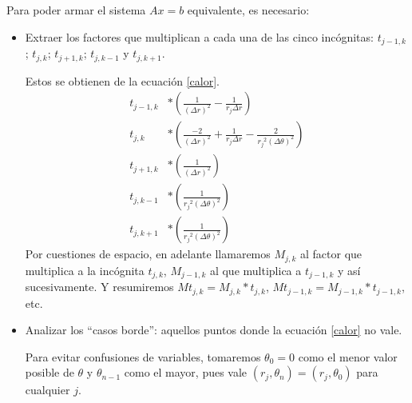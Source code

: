 Para poder armar el sistema $Ax=b$ equivalente, es necesario:
\begin{itemize}
 \item
    Extraer los factores que multiplican a cada una de las cinco incógnitas: $t_{j-1,k}$; $t_{j,k}$; $t_{j+1,k}$; $t_{j,k-1}$ y $t_{j,k+1}$.

    Estos se obtienen de la ecuación \ref{calor}.
    \begin{align*}
        t_{j-1, k}&*(\frac{1}{(\Delta r)^2} - \frac{1}{r_j \Delta r}) \\
        t_{j, k}  &*(\frac{-2}{(\Delta r)^2} + \frac{1}{r_j \Delta r} - \frac{2}{{r_j}^2 (\Delta \theta)^2}) \\
        t_{j+1, k}&*(\frac{1}{(\Delta r)^2}) \\
        t_{j, k-1}&*(\frac{1}{{r_j}^2(\Delta \theta)^2}) \\
        t_{j, k+1}&*(\frac{1}{{r_j}^2(\Delta \theta)^2})
    \end{align*}
    Por cuestiones de espacio, en adelante llamaremos $M_{j,k}$ al factor que multiplica a la incógnita $t_{j,k}$, $M_{j-1,k}$ al que multiplica a $t_{j-1,k}$ y así sucesivamente. Y resumiremos $Mt_{j,k} = M_{j,k}*t_{j,k}$, $Mt_{j-1,k}=M_{j-1,k}*t_{j-1,k}$, etc.
 \item
    Analizar los ``casos borde'': aquellos puntos donde la ecuación \ref{calor} no vale.
    
    Para evitar confusiones de variables, tomaremos $\theta_0 = 0$ como el menor valor posible de $\theta$ y $\theta_{n-1}$ como el mayor, pues vale $(r_j, \theta_n) = (r_j, \theta_0)$ para cualquier $j$. 
    

\end{itemize}
